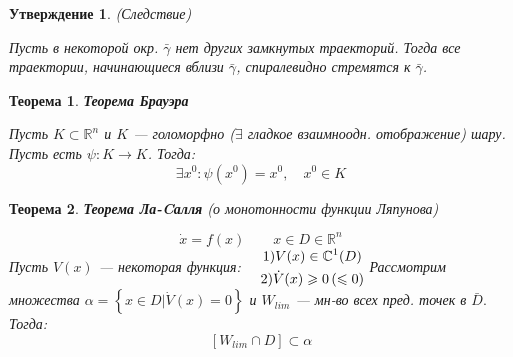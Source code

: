 \documentclass[oneside, final, 12pt]{article}
\theoremstyle{def}
\theoremstyle{th}
\newtheorem{theorem}{Теорема}[section]
\newtheorem{assertion}{Утверждение}[section]
\theoremstyle{rem}
\numberwithin{figure}{section}
\numberwithin{equation}{section}
\begin{document}
	\begin{assertion} (Следствие)
	 	
			Пусть в некоторой окр. $\bar{\gamma}$ нет других замкнутых траекторий. Тогда все траектории,
			 начинающиеся вблизи $\bar{\gamma}$, спиралевидно стремятся к $\bar{\gamma}$.
	\end{assertion}

	\begin{theorem} \textbf{Теорема Брауэра}
	
		Пусть $K \subset \mathbb{R}^n$ и $K$ --- голоморфно ($\exists$  гладкое взаимноодн. отображение) 
			шару. \newline Пусть есть $\psi: K\rightarrow K$. Тогда:
		$$	
			\exists x^0: \psi(x^0) = x^0, \quad x^0\in K
		$$
	\end{theorem}
	\begin{theorem} \textbf{Теорема Ла-Cалля} (о монотонности функции Ляпунова)
	
		$$
			\dot{x} = f(x) \qquad x \in D \in \mathbb{R}^n
		$$\newline
		Пусть $V(x)$ --- некоторая функция: $\quad \begin{gathered}
																			1) V(x) \in \mathbb{C}^1(D) \\
																			2) \dot{V}(x) \geqslant 0 \, (\leqslant 0)
																		\end{gathered}\vspace{3mm}$ \newline
		Рассмотрим множества $\alpha= \left\{x \in D\Big| \dot{V}(x) = 0\right\}$ и $W_{lim}$ --- мн-во всех пред. 
																				точек в $\bar{D}.$ Тогда: 
				$$
					 [W_{lim}\cap D] \subset \alpha
				$$
	\end{theorem}
\end{document}

